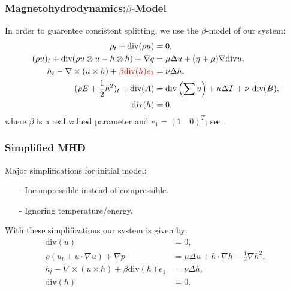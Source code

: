 \documentclass[mathserif]{beamer} %
\begin{document}
\begin{frame}
        \frametitle{Magnetohydrodynamics:$\beta$-Model}
        In order to guarentee consistent splitting, we use the 
        $\beta$-model of our system:
\begin{align*}
    \rho_t + \mathrm{div}(\rho u) &= 0,\nonumber\\
    (\rho u)_t + \mathrm{div}(\rho u \otimes u-h\otimes h)+\nabla q &= \mu \Delta u + (\eta + \mu) \nabla \mathrm{div} u ,\nonumber\\
    h_t - \nabla \times(u\times h) + \textcolor{red}{\beta \textrm{div}(h)e_1}&= \nu \Delta h ,\\
(\rho E + \frac{1}{2}h^2)_t + \textrm{div}(A)&=\textrm{div}\left(\sum u\right)+\kappa \Delta T + \nu \ \textrm{div}(B),\nonumber\\
    \textrm{div}(h) &= 0,\nonumber
\end{align*}
where $\beta$ is a real valued parameter and $e_1 = ( 1 \quad 0 )^T$; 
    see \cite{BMZ}.

\end{frame}

\begin{frame}
        \frametitle{Simplified MHD}
        Major simplifications for initial model:
        \pause
        \begin{itemize}
            \item[-] Incompressible instead of compressible.
        \pause
            \item[-] Ignoring temperature/energy.
        \pause
        \end{itemize}
        With these simplifications our system is given by:
\begin{align*}
    \mathrm{div}(u) &= 0,\nonumber\\
    \rho( u_t + u\cdot \nabla u) +\nabla p &= \mu \Delta u +h\cdot \nabla h - \frac{1}{2}\nabla h^2,\nonumber\\
    h_t - \nabla \times(u\times h) + \beta \textrm{div}(h)e_1&= \nu \Delta h ,\\
    \textrm{div}(h) &= 0.\nonumber
\end{align*}


\end{frame}
\end{document}
